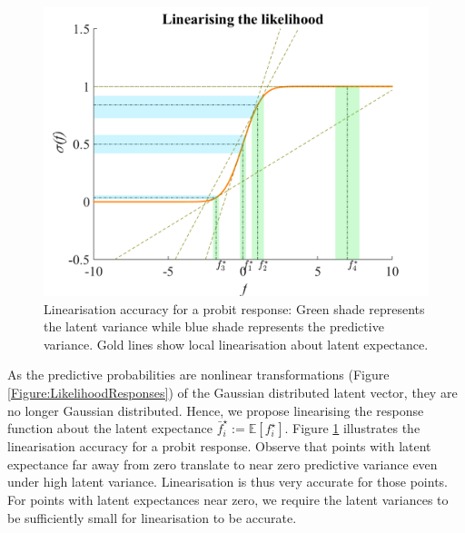 \documentclass{article}
\begin{document}
		\begin{figure}[!htbp]
			\centering
				\includegraphics[width = \linewidth]{Figures/linearisation.png}
			\caption{Linearisation accuracy for a probit response: Green shade represents the latent variance while blue shade represents the predictive variance. Gold lines show local linearisation about latent expectance.}
			\label{Figure:Linearisation}
		\end{figure}
			
		As the predictive probabilities are nonlinear transformations (Figure \ref{Figure:LikelihoodResponses}) of the Gaussian distributed latent vector, they are no longer Gaussian distributed. Hence, we propose linearising the response function about the latent expectance $\bar{f}^{\star}_{i} := \mathbb{E}[f^{\star}_{i}]$. Figure \ref{Figure:Linearisation} illustrates the linearisation accuracy for a probit response. Observe that points with latent expectance far away from zero translate to near zero predictive variance even under high latent variance. Linearisation is thus very accurate for those points. For points with latent expectances near zero, we require the latent variances to be sufficiently small for linearisation to be accurate.
\end{document}
